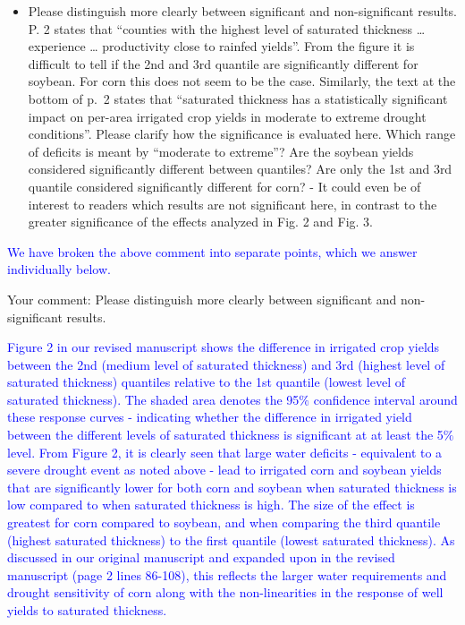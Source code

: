 \documentclass[
]{article}
\providecommand{\tightlist}{%
  \setlength{\itemsep}{0pt}\setlength{\parskip}{0pt}}
\begin{document}
\begin{itemize}
\tightlist
\item
  Please distinguish more clearly between significant and
  non-significant results. P. 2 states that ``counties with the highest
  level of saturated thickness \ldots{} experience \ldots{} productivity
  close to rainfed yields''. From the figure it is difficult to tell if
  the 2nd and 3rd quantile are significantly different for soybean. For
  corn this does not seem to be the case. Similarly, the text at the
  bottom of p.~2 states that ``saturated thickness has a statistically
  significant impact on per-area irrigated crop yields in moderate to
  extreme drought conditions''. Please clarify how the significance is
  evaluated here. Which range of deficits is meant by ``moderate to
  extreme''? Are the soybean yields considered significantly different
  between quantiles? Are only the 1st and 3rd quantile considered
  significantly different for corn? - It could even be of interest to
  readers which results are not significant here, in contrast to the
  greater significance of the effects analyzed in Fig. 2 and Fig. 3.
\end{itemize}

\textcolor{blue}{We have broken the above comment into separate points, which we answer  individually below.}

Your comment: Please distinguish more clearly between significant and
non-significant results.

\textcolor{blue}{
Figure 2 in our revised manuscript shows the difference in irrigated crop yields between the 2nd (medium level of saturated thickness) and 3rd (highest level of saturated thickness) quantiles relative to the 1st quantile (lowest level of saturated thickness). The shaded area denotes the 95$\%$ confidence interval around these response curves - indicating whether the difference in irrigated yield between the different levels of saturated thickness is significant at at least the 5$\%$ level. From Figure 2, it is clearly seen that large water deficits - equivalent to a severe drought event as noted above - lead to irrigated corn and soybean yields that are significantly lower for both corn and soybean when saturated thickness is low compared to when saturated thickness is high. The size of the effect is greatest for corn compared to soybean, and when comparing the third quantile (highest saturated thickness) to the first quantile (lowest saturated thickness). As discussed in our original manuscript and expanded upon in the revised manuscript (page 2 lines 86-108), this reflects the larger water requirements and drought sensitivity of corn along with the non-linearities in the response of well yields to saturated thickness.
}
\end{document}
